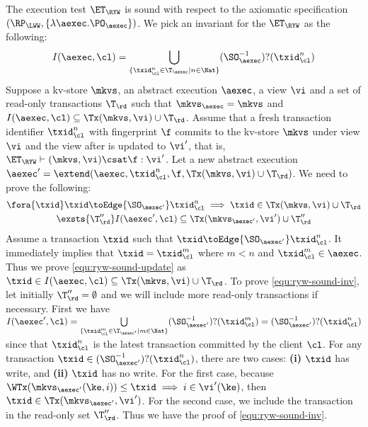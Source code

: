 The execution test $\ET_\RYW$ is sound with respect to the axiomatic specification 
$(\RP_{\LWW}, \{\lambda \aexec. \PO_{\aexec} \})$.
We pick an invariant for the \( \ET_\RYW \) as the following:
\[
    I(\aexec, \cl) = \bigcup_{\{\txid_{\cl}^{n} \in \T_{\aexec} \mid n \in \Nat\}} (\SO_{\aexec}^{-1})?(\txid^n_\cl)
\]
Suppose a kv-store \( \mkvs \), an abstract execution \( \aexec \), a view \( \vi \) and a set of read-only transactions \( \T_\rd \)
such that \( \mkvs_\aexec = \mkvs \) and \( I(\aexec, \cl) \subseteq \Tx(\mkvs, \vi) \cup \T_\rd \).
Assume that a fresh transaction identifier \( \txid_\cl^n \) with fingerprint \( \f \) commits to 
the kv-store \( \mkvs \) under view \( \vi \) and the view after is updated to \( \vi' \), that is, 
\( \ET_\RYW \vdash (\mkvs, \vi) \csat \f : \vi' \).
Let a new abstract execution \( \aexec' = \extend(\aexec, \txid_\cl^n, \f, \Tx(\mkvs, \vi) \cup \T_\rd) \).
We need to prove the following:
\begin{gather}
    \fora{\txid} \txid \toEdge{\SO_{\aexec'}} \txid_\cl^n \implies \txid \in \Tx(\mkvs, \vi) \cup \T_\rd \label{equ:ryw-sound-update}\\
    \exsts{ \T''_{\rd} } I(\aexec',\cl) \subseteq \Tx(\mkvs_{\aexec'}, \vi') \cup \T''_\rd \label{equ:ryw-sound-inv} 
\end{gather}
Assume a transaction \( \txid \) such that \( \txid \toEdge{\SO_{\aexec'}} \txid_\cl^n \).
It immediately implies that \( \txid = \txid_\cl^m\) where \( m < n \) and \( \txid_\cl^m \in \aexec \).
Thus we prove \cref{equ:ryw-sound-update} as \( \txid \in I(\aexec,\cl) \subseteq \Tx(\mkvs,\vi) \cup \T_\rd\).
To prove \cref{equ:ryw-sound-inv}, let initially \( \T''_\rd = \emptyset \) and we will include more read-only transactions if necessary.
First we have \( I(\aexec', \cl) = \bigcup\limits_{\{\txid_{\cl}^{m} \in \T_{\aexec'} \mid m \in \Nat\}} (\SO_{\aexec'}^{-1})?(\txid^m_\cl) = (\SO_{\aexec'}^{-1})?(\txid^n_\cl) \) since that  \( \txid^n_\cl \) is the latest transaction committed by the client \( \cl \).
For any transaction \( \txid \in (\SO_{\aexec'}^{-1})?(\txid^n_\cl) \),
there are two cases: \textbf{(i)} \( \txid \) has write, and \textbf{(ii)} \( \txid \) has no write.
For the first case,
because \( \WTx( \mkvs_{\aexec'}(\ke, i) ) \leq \txid \implies i \in \vi'(\ke) \),
then \( \txid \in \Tx(\mkvs_{\aexec'}, \vi') \).
For the second case, 
we include the transaction in the read-only set \( \T''_\rd \).
Thus we have the proof of \cref{equ:ryw-sound-inv}.


